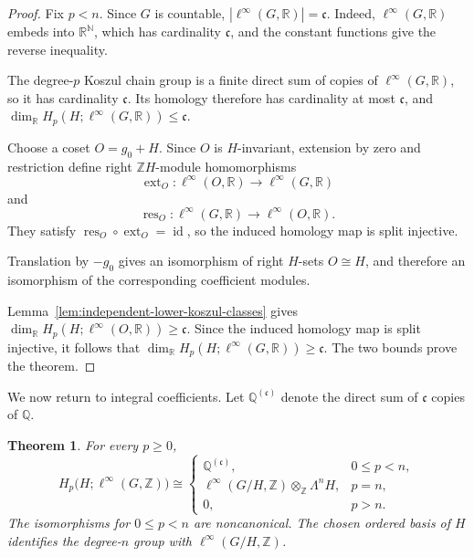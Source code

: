 \documentclass[pdflatex,sn-mathphys-num]{sn-jnl}%
\theoremstyle{plain}
\newtheorem{theorem}{Theorem}[section]
\theoremstyle{remark}
\theoremstyle{definition}
\numberwithin{equation}{section}
\begin{document}
\begin{proof}
Fix \( p<n \). Since \( G \) is countable, \( |\ell^\infty(G,\mathbb R)|=\mathfrak c \). Indeed, \( \ell^\infty(G,\mathbb R) \) embeds into \( \mathbb R^{\mathbb N} \), which has cardinality \( \mathfrak c \), and the constant functions give the reverse inequality.

The degree-\( p \) Koszul chain group is a finite direct sum of copies of \( \ell^\infty(G,\mathbb R) \), so it has cardinality \( \mathfrak c \). Its homology therefore has cardinality at most \( \mathfrak c \), and \( \dim_{\mathbb R}H_p(H;\ell^\infty(G,\mathbb R))\leq\mathfrak c \).

Choose a coset \( O=g_0+H \). Since \( O \) is \( H \)-invariant, extension by zero and restriction define right \( \mathbb ZH \)-module homomorphisms
\[
\operatorname{ext}_O\colon
\ell^\infty(O,\mathbb R)
\longrightarrow
\ell^\infty(G,\mathbb R)
\]
and
\[
\operatorname{res}_O\colon
\ell^\infty(G,\mathbb R)
\longrightarrow
\ell^\infty(O,\mathbb R).
\]
They satisfy \( \operatorname{res}_O\circ\operatorname{ext}_O=\operatorname{id} \), so the induced homology map is split injective.

Translation by \( -g_0 \) gives an isomorphism of right \( H \)-sets \( O\cong H \), and therefore an isomorphism of the corresponding coefficient modules. 

Lemma~\ref{lem:independent-lower-koszul-classes} gives \( \dim_{\mathbb R}H_p(H;\ell^\infty(O,\mathbb R))\geq\mathfrak c \). Since the induced homology map is split injective, it follows that \( \dim_{\mathbb R}H_p(H;\ell^\infty(G,\mathbb R))\geq\mathfrak c \). The two bounds prove the theorem.
\end{proof}

We now return to integral coefficients. Let \( \mathbb Q^{(\mathfrak c)} \) denote the direct sum of \( \mathfrak c \) copies of \( \mathbb Q \).

\begin{theorem}
\label{thm:integer-coefficient-group-homology}
For every \( p\geq0 \),
\[
H_p\bigl(H;\ell^\infty(G,\mathbb Z)\bigr)
\cong
\begin{cases}
\mathbb Q^{(\mathfrak c)},
& 0\leq p<n,\\
\ell^\infty(G/H,\mathbb Z)
\otimes_{\mathbb Z}
\Lambda^nH,
& p=n,\\
0,
& p>n.
\end{cases}
\]
The isomorphisms for \( 0\leq p<n \) are noncanonical. The chosen ordered basis of \( H \) identifies the degree-\( n \) group with \( \ell^\infty(G/H,\mathbb Z) \).
\end{theorem}
\end{document}
